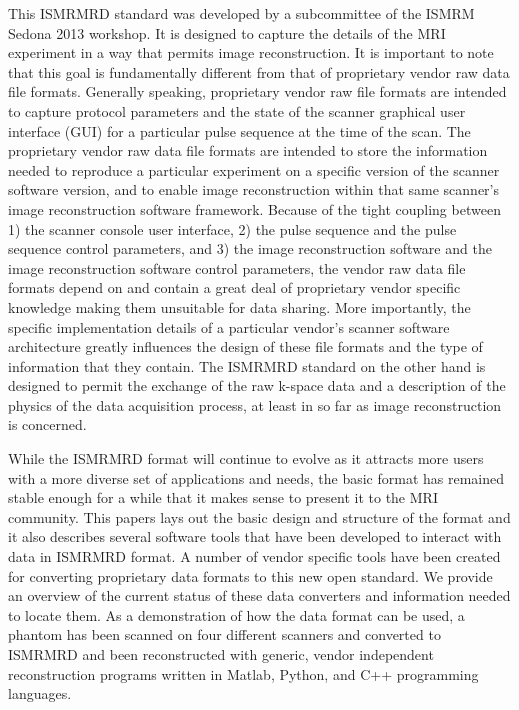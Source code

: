 \documentclass[12pt]{article}
\begin{document}
This ISMRMRD standard was developed by a subcommittee of the ISMRM Sedona 2013 workshop.  It is designed to capture the details of the MRI experiment in a way that permits image reconstruction.  It is important to note that this goal is fundamentally different from that of proprietary vendor raw data file formats.  Generally speaking, proprietary vendor raw file formats are intended to capture protocol parameters and the state of the scanner graphical user interface (GUI) for a particular pulse sequence at the time of the scan.  The proprietary vendor raw data file formats are intended to store the information needed to reproduce a particular experiment on a specific version of the scanner software version, and to enable image reconstruction within that same scanner's image reconstruction software framework.  Because of the tight coupling between 1) the scanner console user interface, 2) the pulse sequence and the pulse sequence control parameters, and 3) the image reconstruction software and the image reconstruction software control parameters, the  vendor raw data file formats depend on and contain a great deal of proprietary vendor specific knowledge making them unsuitable for data sharing.  More importantly, the specific implementation details of a particular vendor's scanner software architecture greatly influences the design of these file formats and the type of information that they contain.  The ISMRMRD standard on the other hand is designed to permit the exchange of the raw k-space data and a description of the physics of the data acquisition process, at least in so far as image reconstruction is concerned.

While the ISMRMRD format will continue to evolve as it attracts more users with a more diverse set of applications and needs, the basic format has remained stable enough for a while that it makes sense to present it to the MRI community. This papers lays out the basic design and structure of the format and it also describes several software tools that have been developed to interact with data in ISMRMRD format. A number of vendor specific tools have been created for converting proprietary data formats to this new open standard. We provide an overview of the current status of these data converters and information needed to locate them. As a demonstration of how the data format can be used, a phantom has been scanned on four different scanners and converted to ISMRMRD and been reconstructed with generic, vendor independent reconstruction programs written in Matlab, Python, and C++ programming languages. 
\end{document}
